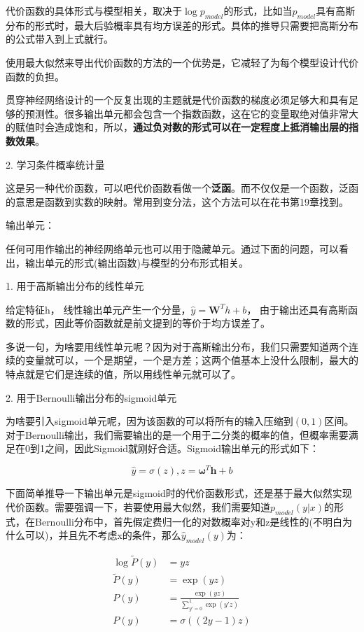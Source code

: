 代价函数的具体形式与模型相关，取决于$\log p_{model}$的形式，比如当$p_{model}$具有高斯分布的形式时，最大后验概率具有均方误差的形式。具体的推导只需要把高斯分布的公式带入到上式就行。

使用最大似然来导出代价函数的方法的一个优势是，它减轻了为每个模型设计代价函数的负担。

贯穿神经网络设计的一个反复出现的主题就是代价函数的梯度必须足够大和具有足够的预测性。很多输出单元都会包含一个指数函数，这在它的变量取绝对值非常大的赋值时会造成饱和，所以，\textbf{通过负对数的形式可以在一定程度上抵消输出层的指数效果}。

2. 学习条件概率统计量

这是另一种代价函数，可以吧代价函数看做一个\textbf{泛函}。而不仅仅是一个函数，泛函的意思是函数到实数的映射。常用到变分法，这个方法可以在花书第19章找到。

输出单元：

任何可用作输出的神经网络单元也可以用于隐藏单元。通过下面的问题，可以看出，输出单元的形式(输出函数)与模型的分布形式相关。

1. 用于高斯输出分布的线性单元

给定特征h， 线性输出单元产生一个分量，$\hat{y}=\mathbf{W}^T h + b$， 由于输出还具有高斯函数的形式，因此等价函数就是前文提到的等价于均方误差了。

多说一句，为啥要用线性单元呢？因为对于高斯输出分布，我们只需要知道两个连续的变量就可以，一个是期望，一个是方差；这两个值基本上没什么限制，最大的特点就是它们是连续的值，所以用线性单元就可以了。

2. 用于Bernoulli输出分布的sigmoid单元

为啥要引入sigmoid单元呢，因为该函数的可以将所有的输入压缩到$(0, 1)$区间。对于Bernoulli输出，我们需要输出的是一个用于二分类的概率的值，但概率需要满足在0到1之间，因此Sigmoid就刚好合适。Sigmoid输出单元的形式如下：

\begin{displaymath}
\hat{y} = \sigma(z), z = \mathbf{\omega}^T\mathbf{h} + b
\end{displaymath}

下面简单推导一下输出单元是sigmoid时的代价函数形式，还是基于最大似然实现代价函数。需要强调一下，若要使用最大似然，我们需要知道$p_{model}(y | x)$的形式，在Bernoulli分布中，首先假定费归一化的对数概率对y和z是线性的(不明白为什么可以)，并且先不考虑x的条件，那么$\hat{y}_{model}(y)$为：

\begin{align*}
\log \tilde{P}(y) & = yz\\
\tilde{P}(y) & = \exp(yz)\\
P(y) &= \frac{\exp(yz)}{\sum_{y'=0}^{1}\exp(y'z)}\\
P(y) & = \sigma((2y - 1)z)
\end{align*}


